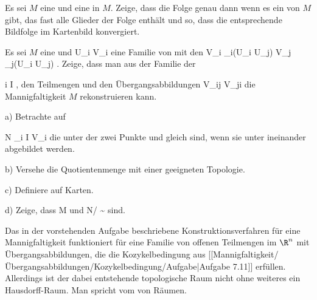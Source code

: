 {}
{

Es sei $M$ eine
und
 eine
in $M$. Zeige, dass die Folge genau dann
wenn es ein
von $M$ gibt, das fast alle Glieder der Folge enthält und so, dass die entsprechende Bildfolge im Kartenbild konvergiert.

}
{} {}

{}
{

Es sei $M$ eine
und
 {U_i } { V_i
} {}
eine Familie von
mit den
 {V_i \cap \alpha_i(U_i \cap U_j) } { V_j \cap \alpha_j(U_i \cap U_j)
} {.}
Zeige, dass man aus der Familie der

 {}
 {i \in I} {}
 {} {} {} {,}
den Teilmengen
 und den Übergangsabbildungen
 {V_{ij}} { V_{ji}
} {}
die Mannigfaltigkeit $M$ rekonstruieren kann.

a) Betrachte auf

\mavergleichskettedisp
{\vergleichskette
{N
}
{ } { \biguplus_{i \in I} V_i
}
{ } {
}
{ } {
}
{ } {
}
}
{}{}{}
die
unter der zwei Punkte
 und
 gleich sind, wenn sie unter
 ineinander abgebildet werden.

b) Versehe die Quotientenmenge
 mit einer geeigneten Topologie.

c) Definiere auf
 Karten.

d) Zeige, dass
\mathkor {} {M} {und} {N/ \sim} {}
sind.

}
{} {}

Das in der vorstehenden Aufgabe beschriebene Konstruktionsverfahren für eine Mannigfaltigkeit funktioniert für eine Familie von offenen Teilmengen im $\R^n$ mit Übergangsabbildungen, die die Kozykelbedingung aus
[[Mannigfaltigkeit/Übergangsabbildungen/Kozykelbedingung/Aufgabe|Aufgabe 7.11]]
erfüllen. Allerdings ist der dabei entstehende topologische Raum nicht ohne weiteres ein Hausdorff-Raum. Man spricht vom  {} von Räumen.

